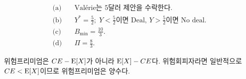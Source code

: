 \begin{answerbox}
\begin{align*}
\text{(a)}\quad &\text{Valérie는 5달러 제안을 수락한다.}\\
\text{(b)}\quad &Y^*=\frac52;\;Y<\frac52\text{이면 Deal, }Y>\frac52\text{이면 No deal}.\\
\text{(c)}\quad &B_{\min}=\frac{10}{3}.\\
\text{(d)}\quad &\Pi=\frac83.
\end{align*}
\end{answerbox}

\begin{warningbox}
위험프리미엄은 $CE-\operatorname{E}[X]$가 아니라 \textbf{$\operatorname{E}[X]-CE$}다. 위험회피자라면 일반적으로 $CE<\operatorname{E}[X]$이므로 위험프리미엄은 양수다.
\end{warningbox}
